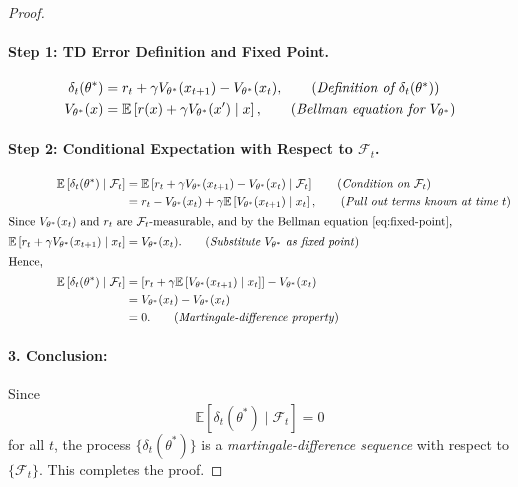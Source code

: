 \begin{proof}
\;\newline
\paragraph{Step 1: TD Error Definition and Fixed Point.}
\begin{align}
    \delta_t(\theta^*) &= r_t + \gamma V_{\theta^*}(x_{t+1}) - V_{\theta^*}(x_t),
    \tag{\textit{Definition of \( \delta_t(\theta^*) \)}}
    \label{eq:td-error-def} \\
    V_{\theta^*}(x) &= \mathbb{E}\left[ r(x) + \gamma V_{\theta^*}(x') \mid x \right],
    \tag{\textit{Bellman equation for \( V_{\theta^*} \)}}
    \label{eq:fixed-point}
\end{align}
\paragraph{Step 2: Conditional Expectation with Respect to \( \mathcal{F}_t \).}
\begin{align}
    \mathbb{E}\left[ \delta_t(\theta^*) \mid \mathcal{F}_t \right] &= \mathbb{E}\left[ r_t + \gamma V_{\theta^*}(x_{t+1}) - V_{\theta^*}(x_t) \mid \mathcal{F}_t \right]
    \tag{\textit{Condition on \( \mathcal{F}_t \)}}
    \label{eq:cond-exp-start} \\
    &= r_t - V_{\theta^*}(x_t) + \gamma \mathbb{E}\left[ V_{\theta^*}(x_{t+1}) \mid x_t \right],
    \tag{\textit{Pull out terms known at time \( t \)}}
    \label{eq:pullout-known} \\
    \intertext{Since \( V_{\theta^*}(x_t) \) and \( r_t \) are \( \mathcal{F}_t \)-measurable, and by the Bellman equation~\eqref{eq:fixed-point},}
    \mathbb{E}\left[ r_t + \gamma V_{\theta^*}(x_{t+1}) \mid x_t \right] &= V_{\theta^*}(x_t).
    \tag{\textit{Substitute \( V_{\theta^*} \) as fixed point}}
    \label{eq:bellman-sub} \\
    \intertext{Hence,}
    \mathbb{E}\left[ \delta_t(\theta^*) \mid \mathcal{F}_t \right] &= \left[ r_t + \gamma \mathbb{E}\left[ V_{\theta^*}(x_{t+1}) \mid x_t \right] \right] - V_{\theta^*}(x_t) \\
    &= V_{\theta^*}(x_t) - V_{\theta^*}(x_t) \\
    &= 0.
    \tag{\textit{Martingale-difference property}}
    \label{eq:mds-property}
\end{align}
\paragraph{3. Conclusion:}
Since
\[
    \mathbb{E}\left[ \delta_t(\theta^*) \mid \mathcal{F}_t \right] = 0
\]
for all \( t \), the process \( \{\delta_t(\theta^*)\} \) is a \emph{martingale-difference sequence} with respect to \( \{\mathcal{F}_t\} \). This completes the proof.
\end{proof}